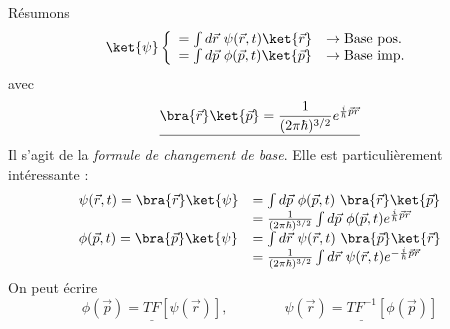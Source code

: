	Résumons
	\begin{equation}
		\ket{\psi}\left\{\begin{array}{ll}
	= \int d\vec{r}\ \psi(\vec{r},t)\ket{\vec{r}} & \rightarrow\text{Base pos.}\\
	= \int d\vec{p}\ \phi(\vec{p},t)\ket{\vec{p}} & \rightarrow\text{Base imp.}		
	\end{array}\right.
	\end{equation}
	avec
		\begin{equation}
	\underline{\bra{\vec{r}}\ket{\vec{p}} = \frac{1}{(2\pi\hbar)^{3/2}}e^{\frac{i}{\hbar}\vec{p}\vec{r}}}
	\end{equation}
	Il s'agit de la \textit{formule de changement de base}. Elle est particulièrement intéressante :
	\begin{equation}
	\begin{array}{ll}
		\psi(\vec{r},t) = \bra{\vec{r}}\ket{\psi} &= \int d\vec{p}\ \phi(\vec{p},t)\ \bra{\vec{r}}\ket{\vec{p}}\\
	&= \frac{1}{(2\pi\hbar)^{3/2}}\int d\vec{p}\ \phi(\vec{p},t)e^{\frac{i}{\hbar}\vec{p}\vec{r}}\\
	\phi(\vec{p},t) = \bra{\vec{p}}\ket{\psi} &= \int d\vec{r}\ \psi(\vec{r},t)\ \bra{\vec{p}}\ket{\vec{r}}\\
	&= \frac{1}{(2\pi\hbar)^{3/2}}\int d\vec{r}\ \psi(\vec{r},t)e^{-\frac{i}{\hbar}\vec{p}\vec{r}}		
	\end{array}
		\end{equation}
	On peut écrire
	\begin{equation}
	\underline{\phi(\vec p) = TF[\psi(\vec{r})]},\qquad\qquad \underline{\psi(\vec r) = TF^{-1}
	[\phi(\vec{p})]}
	\end{equation}
		
